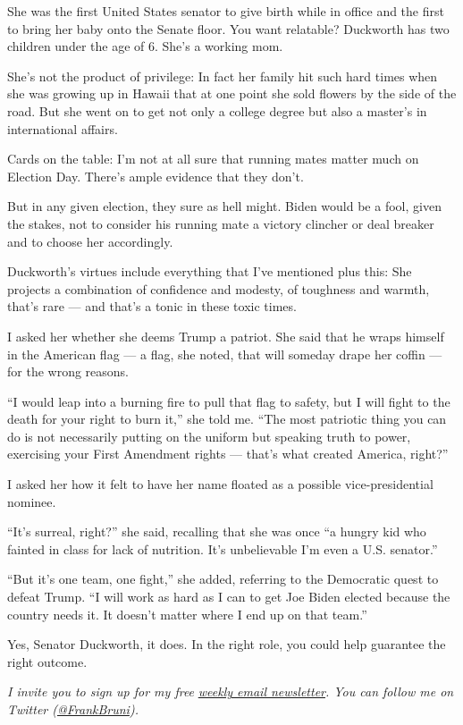 She was the first United States senator to give birth while in office
and the first to bring her baby onto the Senate floor. You want
relatable? Duckworth has two children under the age of 6. She's a
working mom.

She's not the product of privilege: In fact her family hit such hard
times when she was growing up in Hawaii that at one point she sold
flowers by the side of the road. But she went on to get not only a
college degree but also a master's in international affairs.

Cards on the table: I'm not at all sure that running mates matter much
on Election Day. There's ample evidence that they don't.

But in any given election, they sure as hell might. Biden would be a
fool, given the stakes, not to consider his running mate a victory
clincher or deal breaker and to choose her accordingly.

Duckworth's virtues include everything that I've mentioned plus this:
She projects a combination of confidence and modesty, of toughness and
warmth, that's rare --- and that's a tonic in these toxic times.

I asked her whether she deems Trump a patriot. She said that he wraps
himself in the American flag --- a flag, she noted, that will someday
drape her coffin --- for the wrong reasons.

``I would leap into a burning fire to pull that flag to safety, but I
will fight to the death for your right to burn it,'' she told me. ``The
most patriotic thing you can do is not necessarily putting on the
uniform but speaking truth to power, exercising your First Amendment
rights --- that's what created America, right?''

I asked her how it felt to have her name floated as a possible
vice-presidential nominee.

``It's surreal, right?'' she said, recalling that she was once ``a
hungry kid who fainted in class for lack of nutrition. It's unbelievable
I'm even a U.S. senator.''

``But it's one team, one fight,'' she added, referring to the Democratic
quest to defeat Trump. ``I will work as hard as I can to get Joe Biden
elected because the country needs it. It doesn't matter where I end up
on that team.''

Yes, Senator Duckworth, it does. In the right role, you could help
guarantee the right outcome.

\emph{I invite you to sign up for my free}
\href{https://www.nytimes.com/newsletters/frank-bruni}{\emph{weekly
email newsletter}}\emph{. You can follow me on Twitter
(}\href{https://twitter.com/FrankBruni}{\emph{@FrankBruni}}\emph{).}

